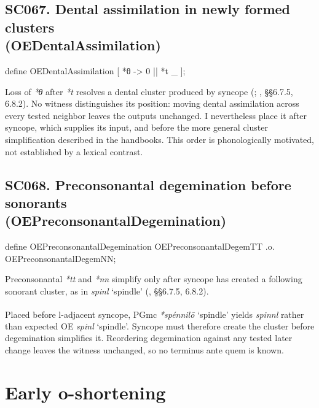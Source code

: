 \documentclass[
  british,
  a4paper,
  openany]{book}
\providecommand{\Pred}[1]{\textsuperscript{\dag}\emph{#1}}
\providecommand{\Recon}[1]{\emph{*#1}}
{\catcode`→=\active \global\def→{\ensuremath{\rightarrow}}}
\providecommand{\texorpdfstring}[2]{#1}
\DeclareRobustCommand{\CAPRRuleHeading}[2]{%
  #1\texorpdfstring{\\(#2)}{ (#2)}%
}
\providecommand{\Pred}[1]{\textsuperscript{\dag}\emph{#1}}
\providecommand{\Recon}[1]{\emph{*#1}}
{\catcode`→=\active \global\def→{\ensuremath{\rightarrow}}}
\begin{document}
\subsection{\texorpdfstring{\CAPRRuleHeading{SC067. Dental assimilation in newly formed clusters}{OEDentalAssimilation}}{}}\label{rule-OEDentalAssimilation}

\begin{ReaderFacingFoma}
define OEDentalAssimilation [
    {*θ} -> 0 || {*t} _
];
\end{ReaderFacingFoma}

Loss of \emph{*θ} after \emph{*t} resolves a dental cluster produced by
syncope (;
, §§6.7.5,
6.8.2). No witness distinguishes its position: moving dental
assimilation across every tested neighbor leaves the outputs unchanged.
I nevertheless place it after syncope, which supplies its input, and
before the more general cluster simplification described in the
handbooks. This order is phonologically motivated, not established by a
lexical contrast.

\subsection{\texorpdfstring{\CAPRRuleHeading{SC068. Preconsonantal degemination before sonorants}{OEPreconsonantalDegemination}}{}}\label{rule-OEPreconsonantalDegemination}

\begin{ReaderFacingFoma}
define OEPreconsonantalDegemination OEPreconsonantalDegemTT .o. OEPreconsonantalDegemNN;
\end{ReaderFacingFoma}

Preconsonantal \emph{*tt} and \emph{*nn} simplify only after syncope has
created a following sonorant cluster, as in \emph{spinl} `spindle'
(,
§§6.7.5, 6.8.2).

Placed before l-adjacent syncope, PGmc \Recon{spénnilō} `spindle' yields
\Pred{spinnl} rather than expected OE \emph{spinl} `spindle'. Syncope
must therefore create the cluster before degemination simplifies it.
Reordering degemination against any tested later change leaves the
witness unchanged, so no terminus ante quem is known.

\newpage

\section{Early o-shortening}\label{early-o-shortening}
\end{document}
